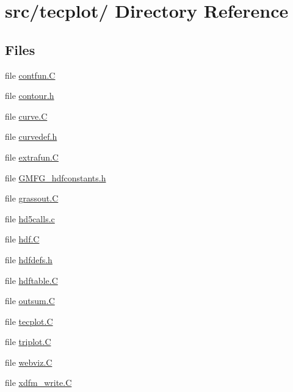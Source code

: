 \hypertarget{dir_000005}{
\section{src/tecplot/ Directory Reference}
\label{dir_000005}
}
\subsection*{Files}
\begin{CompactItemize}
\item 
file \hyperlink{contfun_8C}{contfun.C}
\item 
file \hyperlink{contour_8h}{contour.h}
\item 
file \hyperlink{curve_8C}{curve.C}
\item 
file \hyperlink{curvedef_8h}{curvedef.h}
\item 
file \hyperlink{extrafun_8C}{extrafun.C}
\item 
file \hyperlink{GMFG__hdfconstants_8h}{GMFG\_\-hdfconstants.h}
\item 
file \hyperlink{grassout_8C}{grassout.C}
\item 
file \hyperlink{hd5calls_8c}{hd5calls.c}
\item 
file \hyperlink{hdf_8C}{hdf.C}
\item 
file \hyperlink{hdfdefs_8h}{hdfdefs.h}
\item 
file \hyperlink{hdftable_8C}{hdftable.C}
\item 
file \hyperlink{outsum_8C}{outsum.C}
\item 
file \hyperlink{tecplot_8C}{tecplot.C}
\item 
file \hyperlink{triplot_8C}{triplot.C}
\item 
file \hyperlink{webviz_8C}{webviz.C}
\item 
file \hyperlink{xdfm__write_8C}{xdfm\_\-write.C}
\end{CompactItemize}
